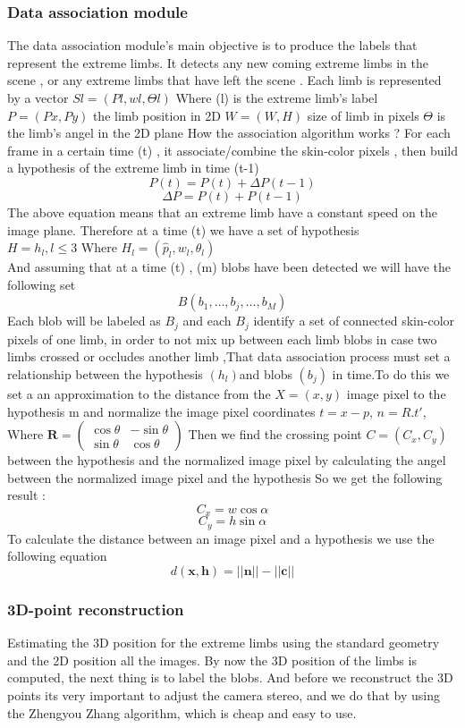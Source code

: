 \documentclass[a4paper]{article}
\begin{document}
\subsubsection{Data association module}
The data association module's main objective is to  produce the labels that represent the extreme limbs. It detects any new coming  extreme limbs in the scene  , or any extreme limbs that have left the scene .
Each limb is represented by a vector $Sl = (Pl , wl , ϴl)$ Where (l) is the extreme limb's label $P=(Px, Py)$ the limb position in 2D
$W= (W,H)$ size of limb in pixels $ϴ$ is the limb's angel in the 2D plane How the association algorithm works ?
For each frame in a certain time (t) , it associate/combine  the skin-color pixels ,  then build a hypothesis  of the extreme limb in time (t-1)
$$P(t) = P(t)+ΔP(t-1)$$
$$ΔP= P(t)+P(t-1)$$
The above equation means that an extreme limb have a constant speed on the image plane.
Therefore at a time (t) we have a set of hypothesis \\ $H={h_l} , l\leq 3$ Where  $H_l = ( \hat{p}_l ,w_l, \theta_l)$ \\ 
And assuming that at a time (t) , (m) blobs have been detected  we will have the following set $$B(b_1 ,…, b_j,…, b_M)$$
Each blob will be labeled as $B_j$ and each $B_j$  identify a set of connected skin-color pixels of one limb, in order to not mix up between each limb
blobs in case two limbs crossed or occludes another limb ,That data association  process must set a relationship between the hypothesis $(h_l)$and blobs
$(b_j)$ in time.To do this we set a an approximation to the distance from the $X=(x,y)$ image  pixel to the hypothesis m and normalize the image pixel
coordinates  $t= x - p$, $n= R. t'$, Where $\mathbf R = \begin{pmatrix} \cos\theta & -\sin\theta \\
\sin\theta & \cos\theta \end{pmatrix}  $
Then we find the crossing point $C=(C_x , C_y)$ between the hypothesis and the normalized image pixel by calculating the angel between the normalized image 
pixel and the hypothesis So we get the following result : $$C_x = w \cos \alpha$$ $$C_y = h \sin \alpha$$
To calculate the distance between an image pixel and a hypothesis we use the following equation $$ d(\mathbf{x},\mathbf{h}) = ||\mathbf{n}|| - ||\mathbf{c}|| $$


\subsubsection{3D-point reconstruction}
Estimating the 3D position for the extreme limbs using the standard geometry and the 2D position all the images.
By now the 3D position of the limbs is computed, the next thing is to label the blobs. And before we reconstruct the 3D points
its very important to adjust the camera stereo, and we do that by using the Zhengyou Zhang algorithm, which is cheap and easy to use.
\end{document}
